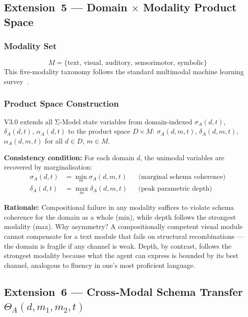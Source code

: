 \subsection{Extension~5 --- Domain \texorpdfstring{$\times$}{x} Modality Product Space}\label{sec:product-space}

\subsubsection{Modality Set}
\begin{equation}\label{eq:modalities}
M = \{\text{text, visual, auditory, sensorimotor, symbolic}\}
\end{equation}
This five-modality taxonomy follows the standard multimodal machine learning survey~\citep{baltrušaitis2018multimodal}.
 
\subsubsection{Product Space Construction}

V3.0 extends all Σ-Model state variables from domain-indexed
$\sigma_A(d, t)$, $\delta_A(d, t)$, $\alpha_A(d, t)$ to the product space $D \times M$:
$\sigma_A(d, m, t)$, $\delta_A(d, m, t)$, $\alpha_A(d, m, t)$ for all $d \in D$, $m \in M$.

\textbf{Consistency condition:} For each domain $d$, the unimodal variables
are recovered by marginalisation:
\begin{align}
\sigma_A(d, t) &= \min_m \sigma_A(d, m, t) & &\text{(marginal schema coherence)} \label{eq:marginal-sigma} \\
\delta_A(d, t) &= \max_m \delta_A(d, m, t) & &\text{(peak parametric depth)} \label{eq:marginal-delta}
\end{align}

\textbf{Rationale:} Compositional failure in any modality suffices to
violate schema coherence for the domain as a whole (min), while
depth follows the strongest modality (max). Why asymmetry? A
compositionally competent visual module cannot compensate for a text
module that fails on structural recombinations --- the domain is
fragile if any channel is weak. Depth, by contrast, follows the
strongest modality because what the agent can express is bounded by
its best channel, analogous to fluency in one's most proficient language.

\subsection{Extension~6 --- Cross-Modal Schema Transfer \texorpdfstring{$\Theta_A(d,m_1,m_2,t)$}{Theta\_A(d,m\_1,m\_2,t)}}\label{sec:cross-modal}

